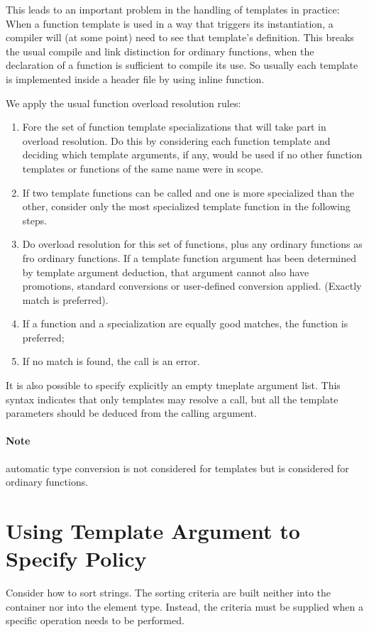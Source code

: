 \documentclass[11pt, a4paper]{book}
\begin{document}
\begin{itemize}
\begin{enumerate}
\end{enumerate}
This leads to an important problem in the handling of templates in practice: When a function template is used in a way that triggers its instantiation, a compiler will (at some point) need to see that template's definition. This breaks the usual compile and link distinction for ordinary functions, when the declaration of a function is sufficient to compile its use. So usually each template is implemented inside a header file by using inline function.

We apply the usual function overload resolution rules:
\begin{enumerate}
	\item Fore the set of function template specializations that will take part in overload resolution. Do this by considering each function template and deciding which template arguments, if any, would be used if no other function templates or functions of the same name were in scope.
	\item If two template functions can be called and one is more specialized than the other, consider only the most specialized template function in the following steps.
	\item Do overload resolution for this set of functions, plus any ordinary functions as fro ordinary functions. If a template function argument has been determined by template argument deduction, that argument cannot also have promotions, standard conversions or user-defined conversion applied. (Exactly match is preferred).	
	\item If a function and a specialization are equally good matches, the function is preferred;
	\item If no match is found, the call is an error.
\end{enumerate}
It is also possible to specify explicitly an empty tmeplate argument list. This syntax indicates that only templates may resolve a call, but all the template parameters should be deduced from the calling argument.

\paragraph{Note} automatic type conversion is not considered for templates but is considered for ordinary functions.
\section{Using Template Argument to Specify Policy }
Consider how to sort strings. The sorting criteria are built neither into the container nor into the element type. Instead, the criteria must be supplied when a specific operation needs to be performed. 


\end{itemize}
\end{document}
